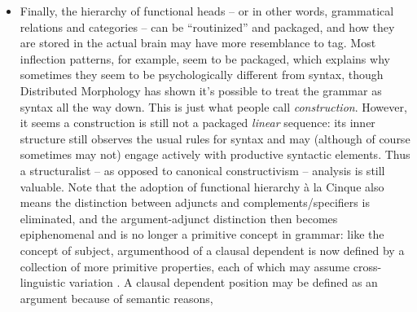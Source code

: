 \documentclass[a4paper, oneside, 12pt]{report}
\newcommand*{\citesec}[1]{\S~{#1}}
\newcommand*{\term}[1]{\emph{#1}}
\begin{document}
{\begin{itemize}
        because the diachronic change of the frequency of OVAux
        looks very different from the diachronic change of the overall OV frequency,
        which includes, say, OAuxV \citep{danckaert2015studying}.
        But after we accept the semi-configurational approach, 
        we can then do tests like, say, Principles A, B, and C, 
        coordination and ellipsis tests, etc.,
        on slots of these templates, 
        and usually a hierarchy of 
        relative ``strength '' of dependency relations
        can be established 
        \citep[\citesec{1.6}]{danckaert2017development}.
        Then, by the duality between constituency and dependency, 
        usually we will find 
        that a constituency-based analysis is \emph{accurate} for 
        a so-called non-configurational language, 
        although it may not be \emph{convenient} 
        for its documentation.
    \item Finally, the hierarchy of functional heads -- or in other words, 
        grammatical relations and categories -- 
        can be ``routinized'' and packaged,
        and how they are stored in the actual brain 
        may have more resemblance to \ac{tag}. 
        Most inflection patterns, for example, 
        seem to be packaged, 
        which explains why sometimes they seem to be psychologically different from syntax, 
        though Distributed Morphology has shown it's possible to treat the grammar 
        as syntax all the way down. 
        This is just what people call \term{construction}.
        However, it seems a construction is still not a packaged \emph{linear} sequence: 
        its inner structure still observes the usual rules for syntax 
        and may (although of course sometimes may not) engage 
        actively with productive syntactic elements. 
        Thus a structuralist -- as opposed to canonical constructivism -- 
        analysis is still valuable.
        Note that the adoption of functional hierarchy à la Cinque 
        also means the distinction between adjuncts and complements/specifiers 
        is eliminated, 
        and the argument-adjunct distinction then becomes epiphenomenal 
        and is no longer a primitive concept in grammar:
        like the concept of subject, 
        argumenthood of a clausal dependent 
        is now defined by a collection of more primitive properties, 
        each of which may assume cross-linguistic variation
        \citep{mcinnerney2022argument}.
        A clausal dependent position may be defined as an argument 
        because of semantic reasons,

\end{itemize}}
\end{document}
